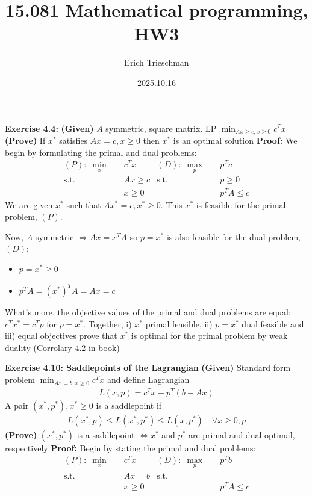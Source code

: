 \documentclass[12pt]{exam}
\title{15.081 Mathematical programming, HW3}
\author{Erich Trieschman}
\date{2025.10.16}
\begin{document}
\maketitle

\begin{questions}
    \question \textbf{Exercise 4.4:} \textbf{(Given)} $A$ symmetric, square matrix. LP $\min_{Ax \geq c, x \geq 0} c^T x$ \textbf{(Prove)} If $x^*$ satisfies $Ax = c, x \geq 0$ then $x^*$ is an optimal solution
    \newline\newline \textbf{Proof:} We begin by formulating the primal and dual problems:
    \begin{align*}
      (P):\; \min_x \quad & c^T x & (D):\; \max_p \quad & p^Tc \\
      \text{s.t.} \quad & Ax \geq c & \text{s.t.} \quad & p \geq 0\\
      & x \geq 0 & & p^T A \leq c 
    \end{align*}
    We are given $x^*$ such that $Ax^* = c, x^* \geq 0$. This $x^*$ is feasible for the primal problem, $(P)$. 
    
    Now, $A$ symmetric $\Longrightarrow Ax = x^TA$ so $p=x^*$ is also feasible for the dual problem, $(D)$:
    \begin{itemize}
      \item $p = x^* \geq 0$
      \item $p^T A = (x^*)^T A = Ax = c$
    \end{itemize}
    What's more, the objective values of the primal and dual problems are equal: $c^Tx^* = c^Tp$ for $p=x^*$. Together, i) $x^*$ primal feasible, ii) $p=x^*$ dual feasible and iii) equal objectives prove that $x^*$ is optimal for the primal problem by weak duality (Corrolary 4.2 in book)



    \question \textbf{Exercise 4.10: Saddlepoints of the Lagrangian} \newline\textbf{(Given)} Standard form problem $\min_{Ax = b, x\geq 0} c^Tx$ and define Lagrangian 
    \begin{align*}
      L(x, p) = c^Tx + p^T(b - Ax)
    \end{align*}
    A pair $(x^*, p^*), x^*\geq 0$ is a saddlepoint if
    \begin{align*}
        L(x^*, p) \leq L(x^*, p^*) \leq L(x, p^*) \quad \forall x\geq 0, p
    \end{align*} 
    \textbf{(Prove)} $(x^*,p^*)$ is a saddlepoint $\iff x^*$ and $p^*$ are primal and dual optimal, respectively
    \newline\newline \textbf{Proof:} 
    Begin by stating the primal and dual problems:
    \begin{align*}
      (P):\; \min_x \quad & c^T x & (D):\; \max_p \quad & p^Tb \\
      \text{s.t.} \quad & Ax = b & \text{s.t.} \quad & \\
      & x \geq 0 & & p^T A \leq c 
    \end{align*}
    \begin{parts}

\end{parts}
\end{questions}
\end{document}
